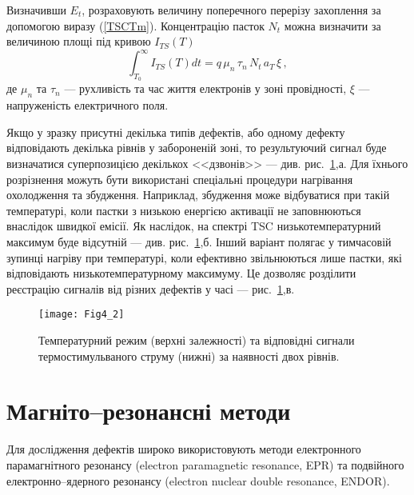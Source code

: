 Визначивши $E_t$, розраховують величину поперечного перерізу захоплення за допомогою виразу (\ref{TSCTm}).
Концентрацію пасток $N_t$ можна визначити за величиною площі під
кривою $I_{TS}(T)$
\begin{equation}
\label{TSCNt}
\int_{T_0}^\infty I_{TS}(T) dt=q\,\mu_n\,\tau_n\,N_t\,a_T\,\xi\,,
\end{equation}
де
$\mu_n$ та $\tau_n$ --- рухливість та час життя електронів у зоні провідності,
$\xi$ --- напруженість електричного поля.

Якщо у зразку присутні декілька типів дефектів, або одному дефекту
відповідають декілька рівнів у забороненій зоні,
то результуючий сигнал буде визначатися суперпозицією
декількох <<дзвонів>> --- див. рис.~\ref{F42},а.
Для їхнього розрізнення можуть бути використані спеціальні
процедури нагрівання охолодження та збудження.
Наприклад, збудження може відбуватися при такій температурі,
коли пастки з низькою енергією активації не заповнюються внаслідок
швидкої емісії.
Як наслідок, на спектрі TSC низькотемпературний максимум буде відсутній --- див. рис.~\ref{F42},б.
Інший варіант полягає у тимчасовій зупинці нагріву при температурі, коли ефективно звільнюються
лише пастки, які відповідають низькотемпературному максимуму.
Це дозволяє розділити реєстрацію сигналів від різних дефектів у часі --- рис.~\ref{F42},в.

\begin{figure}[b]
\center
\vspace{-2mm}
\texttt{[image: Fig4\_2]}
\vspace{-3mm}
\caption{Температурний режим (верхні залежності) та
відповідні сигнали термостимульваного струму (нижні)
за наявності двох рівнів.}
\vspace{-3mm}
\label{F42}
\end{figure}


\chapter{Магніто--резонансні методи}\label{chapER}

Для дослідження дефектів широко використовують
методи електронного парамагнітного резонансу
(electron paramagnetic resonance, EPR) та подвійного електронно--ядерного резонансу
(electron nuclear double resonance, ENDOR).

